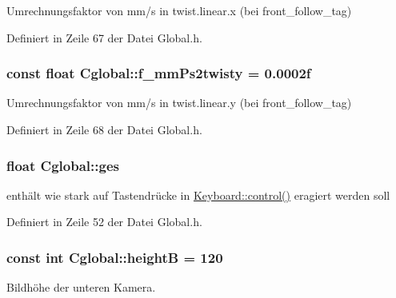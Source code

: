 Umrechnungsfaktor von mm/s in twist.linear.x (bei front\_\-follow\_\-tag) 



Definiert in Zeile 67 der Datei Global.h.

\hypertarget{class_cglobal_abeca26e674667f54df37cec645067854}{
\subsubsection[{f\_\-mmPs2twisty}]{\setlength{\rightskip}{0pt plus 5cm}const float {\bf Cglobal::f\_\-mmPs2twisty} = 0.0002f}}
\label{class_cglobal_abeca26e674667f54df37cec645067854}


Umrechnungsfaktor von mm/s in twist.linear.y (bei front\_\-follow\_\-tag) 



Definiert in Zeile 68 der Datei Global.h.

\hypertarget{class_cglobal_a478c0d94a8f8a7675d3e88e85742c81a}{
\subsubsection[{ges}]{\setlength{\rightskip}{0pt plus 5cm}float {\bf Cglobal::ges}}}
\label{class_cglobal_a478c0d94a8f8a7675d3e88e85742c81a}


enthält wie stark auf Tastendrücke in \hyperlink{namespace_keyboard_abfb3168172d115a6516147c6d42f58db}{Keyboard::control()} eragiert werden soll 



Definiert in Zeile 52 der Datei Global.h.

\hypertarget{class_cglobal_ade7cccb8bca50ca0e4740a4cecfb7498}{
\subsubsection[{heightB}]{\setlength{\rightskip}{0pt plus 5cm}const int {\bf Cglobal::heightB} = 120}}
\label{class_cglobal_ade7cccb8bca50ca0e4740a4cecfb7498}


Bildhöhe der unteren Kamera. 




